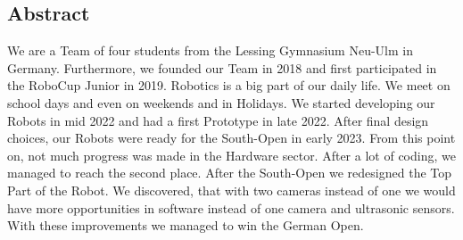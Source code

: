 \subsection{Abstract}
We are a Team of four students from the Lessing Gymnasium Neu-Ulm in Germany. Furthermore, we founded our Team
in 2018 and first participated in the RoboCup Junior in 2019. Robotics is a big part of our daily life.
We meet on school days and even on weekends and in Holidays.
\newline
\newline
We started developing our Robots in mid 2022 and had a first Prototype in late 2022. After final design
choices, our Robots were ready for the South-Open in early 2023. From this point on, not much progress was
made in the Hardware sector.
After a lot of coding, we managed to reach the second place.
\newline
After the South-Open we redesigned the Top Part of the Robot. We discovered, that with two cameras
instead of one we would have more opportunities in software instead of one camera and ultrasonic sensors.
With these improvements we managed to win the German Open.